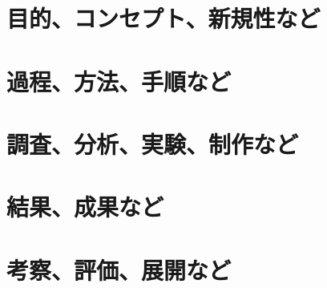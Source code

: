 \documentclass[uplatex,dvipdfmx]{ujarticle}
\begin{document}
\section{目的、コンセプト、新規性など}

\section{過程、方法、手順など}

\section{調査、分析、実験、制作など}

\section{結果、成果など}

\section{考察、評価、展開など}
\end{document}
